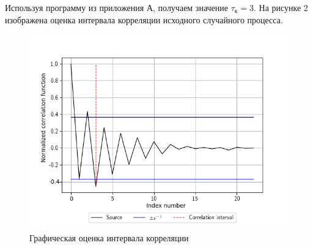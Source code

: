 \documentclass[12pt, fleqn]{article}
\begin{document}
{\begin{enumerate}
{		      	Используя программу из приложения А, получаем значение $ \tau_\text{к}  = 3 $. На рисунке 2 изображена оценка интервала корреляции исходного случайного процесса.
		      	\begin{figure}[H]
		      		\includegraphics{plot2.png}
		      		\caption{Графическая оценка интервала корреляции}
		      	\end{figure}
		      }
	\end{enumerate}
}
  

\newpage
\end{document}
